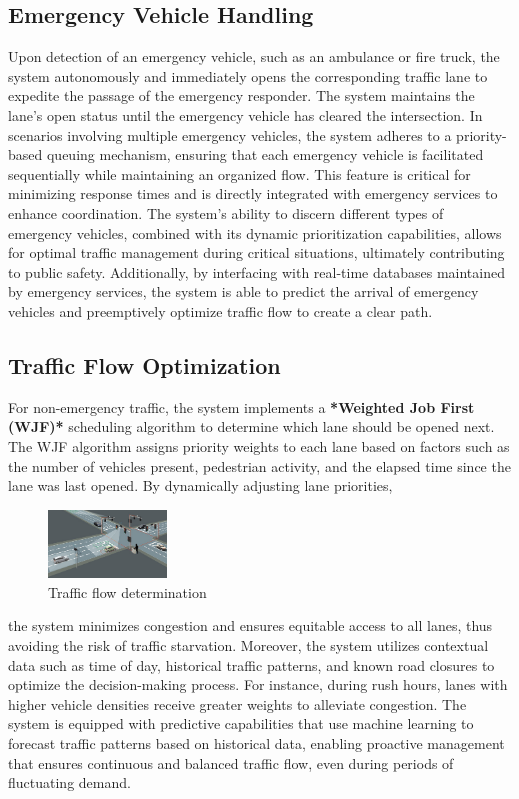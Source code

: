 \documentclass[usenatbib]{tjaa}
\begin{document}
\subsection{Emergency Vehicle Handling}
Upon detection of an emergency vehicle, such as an ambulance or fire truck, the system autonomously and immediately opens the corresponding traffic lane to expedite the passage of the emergency responder. The system maintains the lane's open status until the emergency vehicle has cleared the intersection. In scenarios involving multiple emergency vehicles, the system adheres to a priority-based queuing mechanism, ensuring that each emergency vehicle is facilitated sequentially while maintaining an organized flow. This feature is critical for minimizing response times and is directly integrated with emergency services to enhance coordination. The system's ability to discern different types of emergency vehicles, combined with its dynamic prioritization capabilities, allows for optimal traffic management during critical situations, ultimately contributing to public safety. Additionally, by interfacing with real-time databases maintained by emergency services, the system is able to predict the arrival of emergency vehicles and preemptively optimize traffic flow to create a clear path.

\subsection{Traffic Flow Optimization}
For non-emergency traffic, the system implements a 
\textbf{*Weighted Job First (WJF)*} scheduling algorithm to determine which lane should be opened next. The WJF algorithm assigns priority weights to each lane based on factors such as the number of vehicles present, pedestrian activity, and the elapsed time since the lane was last opened. By dynamically adjusting lane priorities,
\begin{figure}
    \centering
    \includegraphics[width=0.28\textwidth]{2_.jpg}
    \caption{Traffic flow determination} %
    \label{fig:wrapped} %
\end{figure}
the system minimizes congestion and ensures equitable access to all lanes, thus avoiding the risk of traffic starvation. Moreover, the system utilizes contextual data such as time of day, historical traffic patterns, and known road closures to optimize the decision-making process. For instance, during rush hours, lanes with higher vehicle densities receive greater weights to alleviate congestion. The system is equipped with predictive capabilities that use machine learning to forecast traffic patterns based on historical data, enabling proactive management that ensures continuous and balanced traffic flow, even during periods of fluctuating demand.
\end{document}
